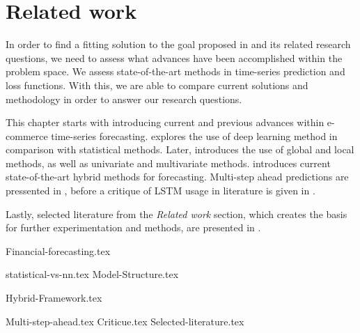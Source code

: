 \chapter{Related work}
\label{section:RelatedWork}

In order to find a fitting solution to the goal proposed in  and its related research questions,
we need to assess what advances have been accomplished within the problem space.
We assess state-of-the-art methods in time-series prediction and loss functions.
With this, we are able to compare current solutions and methodology in order to answer our research questions.

This chapter starts with  introducing current and previous advances within e-commerce time-series forecasting.
 explores the use of deep learning method in comparison with statistical methods.
Later,  introduces the use of global and local methods, as well as univariate and multivariate methods.
 introduces current state-of-the-art hybrid methods for forecasting.
Multi-step ahead predictions are pressented in ,
before a critique of LSTM usage in literature is given in .

Lastly, selected literature from the \textit{Related work} section, which creates the basis for further experimentation and methods,
 are presented in .



{Financial-forecasting.tex}

{statistical-vs-nn.tex}
{Model-Structure.tex}

{Hybrid-Framework.tex}

{Multi-step-ahead.tex}
{Criticue.tex}
{Selected-literature.tex}

